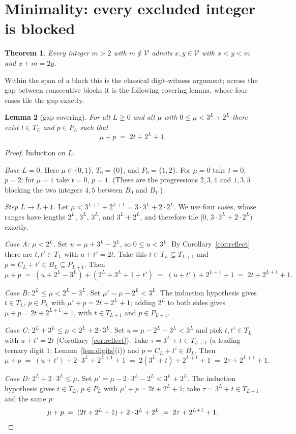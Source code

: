 \documentclass[12pt]{article}
\theoremstyle{plain}
\newtheorem{theorem}{Theorem}
\newtheorem{lemma}[theorem]{Lemma}
\theoremstyle{definition}
\theoremstyle{remark}
\newcommand{\V}{\mathcal{V}}
\begin{document}
\section{Minimality: every excluded integer is blocked}
\label{sec:minimal}

\begin{theorem}\label{thm:blocked}
Every integer $m>2$ with $m\notin\V$ admits $x,y\in\V$ with
$x<y<m$ and $x+m=2y$.
\end{theorem}

Within the span of a block this is the classical digit-witness
argument; across the gap between consecutive blocks it is the
following covering lemma, whose four cases tile the gap exactly.

\begin{lemma}[gap covering]\label{lem:gap}
For all $L\geq 0$ and all $\mu$ with $0\leq\mu<3^L+2^L$ there
exist $t\in T_L$ and $p\in P_L$ such that
\[
\mu+p \;=\; 2t+2^L+1 .
\]
\end{lemma}

\begin{proof}
Induction on $L$.

\emph{Base $L=0$.}  Here $\mu\in\{0,1\}$, $T_0=\{0\}$, and
$P_0=\{1,2\}$.  For $\mu=0$ take $t=0$, $p=2$; for $\mu=1$ take
$t=0$, $p=1$.  (These are the progressions $2,3,4$ and $1,3,5$
blocking the two integers $4,5$ between $B_0$ and $B_1$.)

\emph{Step $L\to L+1$.}  Let
$\mu<3^{L+1}+2^{L+1}=3\cdot 3^L+2\cdot 2^L$.  We use four cases,
whose ranges have lengths $2^L$, $3^L$, $3^L$, and $3^L+2^L$, and
therefore tile $[0,\,3\cdot 3^L+2\cdot 2^L)$ exactly.

\emph{Case A: $\mu<2^L$.}  Set $u=\mu+3^L-2^L$, so
$0\leq u<3^L$.  By Corollary~\ref{cor:reflect} there are
$t,t'\in T_L$ with $u+t'=2t$.  Take this $t\in T_L\subseteq
T_{L+1}$ and $p=C_L+t'\in B_L\subseteq P_{L+1}$.  Then
\[
\mu+p \;=\; (u+2^L-3^L)+(2^L+3^L+1+t')
\;=\; (u+t')+2^{L+1}+1 \;=\; 2t+2^{L+1}+1 .
\]

\emph{Case B: $2^L\leq\mu<2^L+3^L$.}  Set $\mu'=\mu-2^L<3^L$.
The induction hypothesis gives $t\in T_L$, $p\in P_L$ with
$\mu'+p=2t+2^L+1$; adding $2^L$ to both sides gives
$\mu+p=2t+2^{L+1}+1$, with $t\in T_{L+1}$ and $p\in P_{L+1}$.

\emph{Case C: $2^L+3^L\leq\mu<2^L+2\cdot 3^L$.}  Set
$u=\mu-2^L-3^L<3^L$ and pick $t,t'\in T_L$ with $u+t'=2t$
(Corollary~\ref{cor:reflect}).  Take
$\tau=3^L+t\in T_{L+1}$ (a leading ternary digit $1$;
Lemma~\ref{lem:digits}(i)) and $p=C_L+t'\in B_L$.  Then
\[
\mu+p \;=\; (u+t')+2\cdot 3^L+2^{L+1}+1
\;=\; 2(3^L+t)+2^{L+1}+1 \;=\; 2\tau+2^{L+1}+1 .
\]

\emph{Case D: $2^L+2\cdot 3^L\leq\mu$.}  Set
$\mu'=\mu-2\cdot 3^L-2^L<3^L+2^L$.  The induction hypothesis
gives $t\in T_L$, $p\in P_L$ with $\mu'+p=2t+2^L+1$; take
$\tau=3^L+t\in T_{L+1}$ and the same $p$:
\[
\mu+p \;=\; (2t+2^L+1)+2\cdot 3^L+2^L \;=\; 2\tau+2^{L+1}+1 .
\qedhere
\]
\end{proof}
\end{document}
